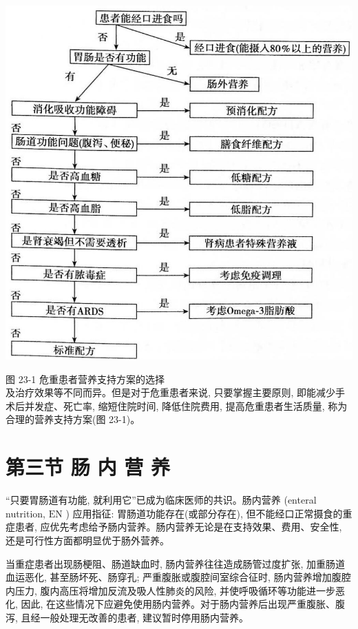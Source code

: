 \documentclass[10pt]{article}
\begin{document}
\begin{center}
\includegraphics[max width=\textwidth]{2024_07_09_002a177993bd97d1d6d7g-242}
\end{center}

图 23-1 危重患者营养支持方案的选择\\
及治疗效果等不同而异。但是对于危重患者来说, 只要掌握主要原则, 即能减少手术后并发症、死亡率, 缩短住院时间, 降低住院费用, 提高危重患者生活质量, 称为合理的营养支持方案(图 23-1)。

\section*{第三节 肠 内 营 养}
“只要胃肠道有功能, 就利用它”已成为临床医师的共识。肠内营养 (enteral nutrition, $\mathrm{EN}$ ) 应用指征: 胃肠道功能存在(或部分存在), 但不能经口正常摄食的重症患者, 应优先考虑给予肠内营养。肠内营养无论是在支持效果、费用、安全性, 还是可行性方面都明显优于肠外营养。

当重症患者出现肠梗阻、肠道缺血时, 肠内营养往往造成肠管过度扩张, 加重肠道血运恶化, 甚至肠坏死、肠穿孔; 严重腹胀或腹腔间室综合征时, 肠内营养增加腹腔内压力, 腹内高压将增加反流及吸人性肺炎的风险, 并使呼吸循环等功能进一步恶化, 因此, 在这些情况下应避免使用肠内营养。对于肠内营养后出现严重腹胀、腹泻, 且经一般处理无改善的患者, 建议暂时停用肠内营养。
\end{document}
